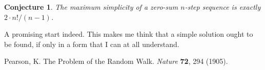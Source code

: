 \documentclass{amsart}
\newtheorem{conjecture}[proposition]{Conjecture}
\theoremstyle{definition}
\theoremstyle{problem}
\theoremstyle{remark}
\begin{document}
\begin{conjecture}
    The maximum simplicity of a zero-sum $n$-step sequence
    is exactly $2\cdot n!/(n-1)$.
\end{conjecture}

A promising start indeed. This makes me think that a simple solution ought to be found,
if only in a form that I can at all understand.

\begin{thebibliography}{9}

    Pearson, K.
    The Problem of the Random Walk.
    \emph{Nature}
    \textbf{72},
    294 (1905).

\end{thebibliography}
\end{document}
